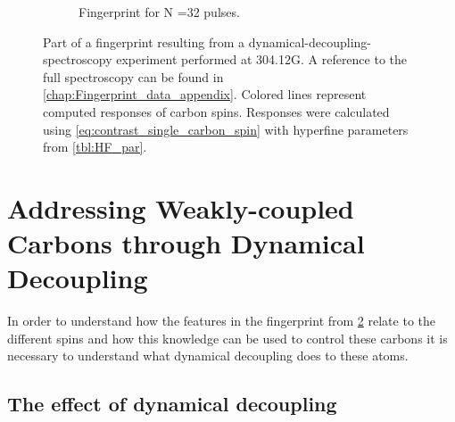 \begin{figure}[htbp]
\begin{subfigure}[t]{\textwidth}
        \caption{Fingerprint for N =32 pulses. }
        \label{fig:FP32}
    \end{subfigure}
    \caption{Part of a fingerprint resulting from a dynamical-decoupling-spectroscopy experiment performed at 304.12G. A reference to the full spectroscopy can be found in \cref{chap:Fingerprint_data_appendix}.  Colored lines represent computed responses of carbon spins. Responses were calculated using \cref{eq:contrast_single_carbon_spin} with hyperfine parameters from \cref{tbl:HF_par}. }
    \label{fig:FP}
\end{figure}

\section{Addressing Weakly-coupled Carbons through Dynamical Decoupling}
\label{controllingacarbonthroughdynamicaldecoupling}

In order to understand how the features in the fingerprint from \cref{fig:FP} relate to the different spins and how this knowledge can be used to control these carbons it is necessary to understand what dynamical decoupling does to these atoms.

\subsection{The effect of dynamical decoupling}

